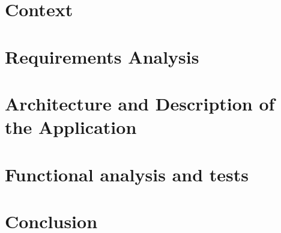 \documentclass[12pt]{report}
\begin{document}

\newpage

\tableofcontents


\chapter{Context}


\chapter{Requirements Analysis}

\chapter{Architecture and Description of the Application}


\chapter{Functional analysis and tests}


\chapter{Conclusion}

\nocite{*}


\end{document}
